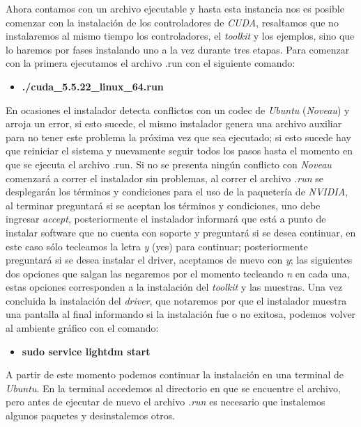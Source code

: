 \documentclass{article}
\begin{document}
Ahora contamos con un archivo ejecutable y hasta esta instancia nos es
posible comenzar con la instalación de los controladores de \emph{CUDA},
resaltamos que no instalaremos al mismo tiempo los controladores, el
\emph{toolkit} y los ejemplos, sino que lo haremos por fases instalando
uno a la vez durante tres etapas. Para comenzar con la primera
ejecutamos el archivo .run con el siguiente comando:

\begin{itemize}
\itemsep1pt\parskip0pt
\item
  \textbf{./cuda\_5.5.22\_linux\_64.run}
\end{itemize}

En ocasiones el instalador detecta conflictos con un codec de
\emph{Ubuntu} (\emph{Noveau}) y arroja un error, si esto sucede, el
mismo instalador genera una archivo auxiliar para no tener este problema
la próxima vez que sea ejecutado; si esto sucede hay que reiniciar el
sistema y nuevamente seguir todos los pasos hasta el momento en que se
ejecuta el archivo .run. Si no se presenta ningún conflicto con
\emph{Noveau} comenzará a correr el instalador sin problemas, al correr
el archivo \emph{.run} se desplegarán los términos y condiciones para el
uso de la paquetería de \emph{NVIDIA}, al terminar preguntará si se
aceptan los términos y condiciones, uno debe ingresar \emph{accept},
posteriormente el instalador informará que está a punto de instalar
software que no cuenta con soporte y preguntará si se desea continuar,
en este caso sólo tecleamos la letra \emph{y} (yes) para continuar;
posteriormente preguntará si se desea instalar el driver, aceptamos de
nuevo con \emph{y}; las siguientes dos opciones que salgan las negaremos
por el momento tecleando \emph{n} en cada una, estas opciones
corresponden a la instalación del \emph{toolkit} y las muestras. Una vez
concluida la instalación del \emph{driver}, que notaremos por que el
instalador muestra una pantalla al final informando si la instalación
fue o no exitosa, podemos volver al ambiente gráfico con el comando:

\begin{itemize}
\itemsep1pt\parskip0pt
\item
  \textbf{sudo service lightdm start}
\end{itemize}

A partir de este momento podemos continuar la instalación en una
terminal de \emph{Ubuntu}. En la terminal accedemos al directorio en que
se encuentre el archivo, pero antes de ejecutar de nuevo el archivo
\emph{.run} es necesario que instalemos algunos paquetes y desinstalemos
otros.
\end{document}
